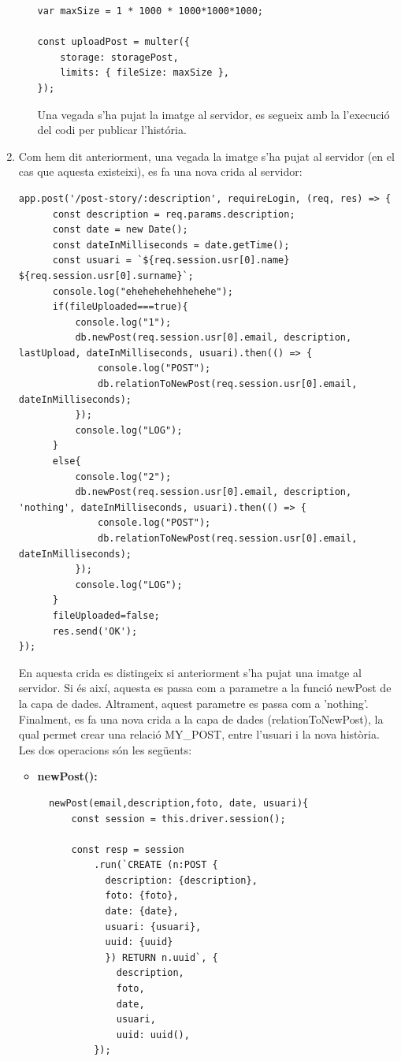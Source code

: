 \documentclass[11pt,catalan,listoffigures,listoftables]{tfgetsinf}
\begin{document}
\begin{enumerate}
\begin{enumerate}
\begin{lstlisting}
var maxSize = 1 * 1000 * 1000*1000*1000;

const uploadPost = multer({
    storage: storagePost,
    limits: { fileSize: maxSize },
});
\end{lstlisting}
Una vegada s'ha pujat la imatge al servidor, es segueix amb la l'execució del codi per publicar l'história.
\end{enumerate}
\item Com hem dit anteriorment, una vegada la imatge s'ha pujat al servidor (en el cas que aquesta existeixi), es fa una nova crida al servidor:
\begin{lstlisting}
app.post('/post-story/:description', requireLogin, (req, res) => {
      const description = req.params.description;
      const date = new Date();
      const dateInMilliseconds = date.getTime();
      const usuari = `${req.session.usr[0].name} ${req.session.usr[0].surname}`;
      console.log("ehehehehehhehehe");
      if(fileUploaded===true){
          console.log("1");
          db.newPost(req.session.usr[0].email, description, lastUpload, dateInMilliseconds, usuari).then(() => {
              console.log("POST");
              db.relationToNewPost(req.session.usr[0].email, dateInMilliseconds);
          });
          console.log("LOG");
      }
      else{
          console.log("2");
          db.newPost(req.session.usr[0].email, description, 'nothing', dateInMilliseconds, usuari).then(() => {
              console.log("POST");
              db.relationToNewPost(req.session.usr[0].email, dateInMilliseconds);
          });
          console.log("LOG");
      }
      fileUploaded=false;
      res.send('OK');
});
\end{lstlisting}
En aquesta crida es distingeix si anteriorment s'ha pujat una imatge al servidor. Si és així, aquesta es passa com a parametre a la funció newPost de la capa de dades. Altrament, aquest parametre es passa com a 'nothing'. Finalment, es fa una nova crida a la capa de dades (relationToNewPost), la qual permet crear una relació MY\_POST, entre l'usuari i la nova història. Les dos operacions són les següents:
\begin{itemize}
\item \textbf{newPost():}
\begin{lstlisting}
  newPost(email,description,foto, date, usuari){
      const session = this.driver.session();

      const resp = session
          .run(`CREATE (n:POST {
            description: {description},
            foto: {foto},
            date: {date},
            usuari: {usuari},
            uuid: {uuid}
            }) RETURN n.uuid`, {
              description,
              foto,
              date,
              usuari,
              uuid: uuid(),
          });


\end{lstlisting}
\end{itemize}
\end{enumerate}
\end{document}

